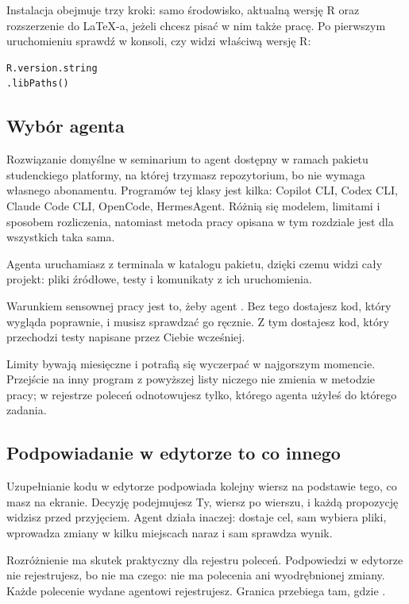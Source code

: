 Instalacja obejmuje trzy kroki: samo środowisko, aktualną wersję R oraz rozszerzenie do LaTeX-a, jeżeli chcesz pisać w nim także pracę. Po pierwszym uruchomieniu sprawdź w konsoli, czy widzi właściwą wersję R:

\begin{lstlisting}[numbers=none]
R.version.string
.libPaths()
\end{lstlisting}

\subsection{Wybór agenta}

Rozwiązanie domyślne w seminarium to agent dostępny w ramach pakietu studenckiego platformy, na której trzymasz repozytorium, bo nie wymaga własnego abonamentu. Programów tej klasy jest kilka: Copilot CLI, Codex CLI, Claude Code CLI, OpenCode, HermesAgent. Różnią się modelem, limitami i sposobem rozliczenia, natomiast metoda pracy opisana w tym rozdziale jest dla wszystkich taka sama.

Agenta uruchamiasz z terminala w katalogu pakietu, dzięki czemu widzi cały projekt: pliki źródłowe, testy i komunikaty z ich uruchomienia.

Warunkiem sensownej pracy jest to, żeby agent . Bez tego dostajesz kod, który wygląda poprawnie, i musisz sprawdzać go ręcznie. Z tym dostajesz kod, który przechodzi testy napisane przez Ciebie wcześniej.

Limity bywają miesięczne i potrafią się wyczerpać w najgorszym momencie. Przejście na inny program z powyższej listy niczego nie zmienia w metodzie pracy; w rejestrze poleceń odnotowujesz tylko, którego agenta użyłeś do którego zadania.

\subsection{Podpowiadanie w edytorze to co innego}

Uzupełnianie kodu w edytorze podpowiada kolejny wiersz na podstawie tego, co masz na ekranie. Decyzję podejmujesz Ty, wiersz po wierszu, i każdą propozycję widzisz przed przyjęciem. Agent działa inaczej: dostaje cel, sam wybiera pliki, wprowadza zmiany w kilku miejscach naraz i sam sprawdza wynik.

Rozróżnienie ma skutek praktyczny dla rejestru poleceń. Podpowiedzi w edytorze nie rejestrujesz, bo nie ma czego: nie ma polecenia ani wyodrębnionej zmiany. Każde polecenie wydane agentowi rejestrujesz. Granica przebiega tam, gdzie .

